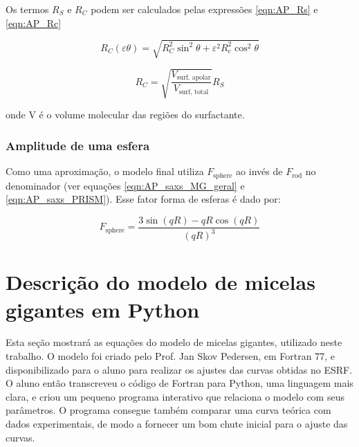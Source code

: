 \begin{apendicesenv}
Os termos \(R_S\) e \(R_C\) podem ser calculados pelas expressões \ref{eqn:AP_Rs} e \ref{eqn:AP_Rc}

\begin{equation}
R_C(\varepsilon\theta) = \sqrt{R_C^2\sin^2\theta + \varepsilon^2R_c^2\cos^2\theta}
\label{eqn:AP_Rc}
\end{equation}

\begin{equation}
R_C = \sqrt{\frac{V_{\textrm{surf, apolar}}}{V_{\textrm{surf, total}}}}R_S
\label{eqn:AP_Rs}
\end{equation}

\noindent onde V é o volume molecular das regiões do surfactante.

\subsection{Amplitude de uma esfera}
Como uma aproximação, o modelo final utiliza \(F_{\mathrm{sphere}}\) ao invés de \(F_{\mathrm{rod}}\) no denominador (ver equações \ref{eqn:AP_saxs_MG_geral} e \ref{eqn:AP_saxs_PRISM}). Esse fator forma de esferas é dado por:

\begin{equation}
	F_{\textrm{sphere}} = \dfrac{3\sin(qR) - qR\cos(qR)}{(qR)^3}
	\label{eqn:AP_Fsphere}
\end{equation}


\chapter{Descrição do modelo de micelas gigantes em Python}
\label{sec:modelo_MG_python}
Esta seção mostrará as equações do modelo de micelas gigantes, utilizado neste trabalho. O modelo foi criado pelo Prof. Jan Skov Pedersen, em Fortran 77, e disponibilizado para o aluno para realizar os ajustes das curvas obtidas no ESRF. O aluno então transcreveu o código de Fortran para Python, uma linguagem mais clara, e criou um pequeno programa interativo que relaciona o modelo com seus parâmetros. O programa consegue também comparar uma curva teórica com dados experimentais, de modo a fornecer um bom chute inicial para o ajuste das curvas.


\end{apendicesenv}
